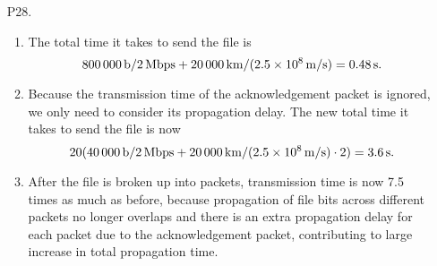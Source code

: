 \documentclass{article}
\begin{document}
\begin{enumerate}
    \item[P28.] \begin{enumerate}
        \item The total time it takes to send the file is
        \[
            \SI{800000}{b} / \SI{2}{Mbps} + \SI{20000}{km} / (\SI{2.5d8}{m/s}) = \SI{0.48}{s}.
        \]
        \item Because the transmission time of the acknowledgement packet is ignored, we only need to consider its propagation delay. The new total time it takes to send the file is now
        \[
            20(\SI{40000}{b} / \SI{2}{Mbps} + \SI{20000}{km} / (\SI{2.5d8}{m/s}) \cdot 2) = \SI{3.6}{s}.
        \]
        \item After the file is broken up into packets, transmission time is now 7.5 times as much as before, because propagation of file bits across different packets no longer overlaps and there is an extra propagation delay for each packet due to the acknowledgement packet, contributing to large increase in total propagation time.
    \end{enumerate}
\end{enumerate}
\end{document}
